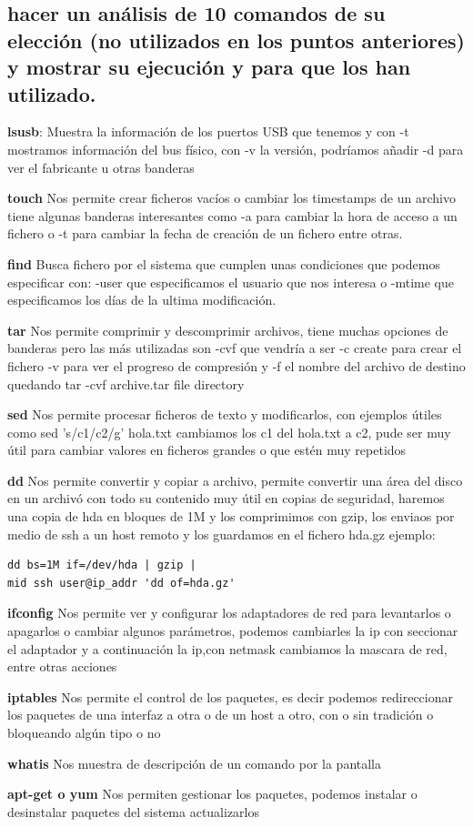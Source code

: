 \documentclass[preprint,11pt]{elsarticle}
\begin{document}
\subsection{hacer un análisis de 10 comandos de su elección (no utilizados en los
puntos anteriores) y mostrar su ejecución y para que los han utilizado.}
\begin{multicols}{2}
\textbf{lsusb}: Muestra la información de los puertos USB que tenemos y con -t mostramos información del bus físico, con -v la versión, podríamos añadir -d para ver el fabricante u otras banderas

\textbf{touch} Nos permite crear ficheros vacíos o cambiar los timestamps de un archivo tiene algunas banderas interesantes como -a para cambiar la hora de acceso a un fichero o -t para cambiar la fecha de creación de un fichero entre otras. 

\textbf{find}  Busca fichero por el sistema que cumplen unas condiciones que podemos especificar con: -user que especificamos el usuario que nos interesa o -mtime que especificamos los días de la ultima modificación.

\textbf{tar} Nos permite comprimir y descomprimir archivos, tiene muchas opciones de banderas pero las más utilizadas son -cvf que vendría a ser -c create para crear el fichero -v para ver el progreso de compresión y -f el nombre del archivo de destino quedando tar -cvf archive.tar file directory

\textbf{sed} Nos permite procesar ficheros de texto y modificarlos, con ejemplos útiles como sed 's/c1/c2/g' hola.txt cambiamos los c1 del hola.txt a c2, pude ser muy útil para cambiar valores en ficheros grandes o que estén muy repetidos

\textbf{dd} Nos permite convertir y copiar a archivo, permite convertir una área del disco en un archivó con todo su contenido muy útil en copias de seguridad, haremos una copia de hda en bloques de 1M y los comprimimos con gzip, los enviaos por medio de ssh a un host remoto y los guardamos en el fichero hda.gz ejemplo:
\begin{lstlisting}
dd bs=1M if=/dev/hda | gzip |
mid ssh user@ip_addr 'dd of=hda.gz'
\end{lstlisting}

\textbf{ifconfig} Nos permite ver y configurar los adaptadores de red para levantarlos o apagarlos o cambiar algunos parámetros, podemos cambiarles la ip con seccionar el adaptador y a continuación la ip,con netmask cambiamos la mascara de red, entre otras acciones

\textbf{iptables} Nos permite el control de los paquetes, es decir podemos redireccionar los paquetes de una interfaz a otra o de un host a otro, con o sin tradición o bloqueando algún tipo o no

\textbf{whatis} Nos muestra de descripción de un comando por la pantalla

\textbf{apt-get o yum } Nos permiten gestionar los paquetes, podemos instalar o desinstalar paquetes del sistema actualizarlos
\end{multicols}
\end{document}
